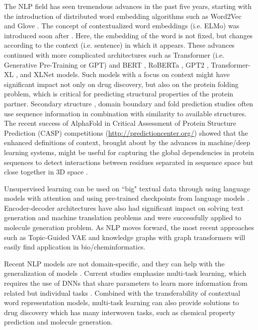 \documentclass[review]{elsarticle}
\begin{document}
The NLP field has seen tremendous advances in the past five years, starting with the introduction of distributed word embedding algorithms such as Word2Vec \cite{mikolov2013distributed} and Glove \cite{pennington2014glove}.  The concept of contextualized word embeddings (i.e. ELMo) was introduced soon after \cite{peters2018deep}. Here, the embedding of the word is not fixed, but changes according to the context (i.e. sentence) in which it appears. These advances continued with more complicated architectures such as  Transformer (i.e. Generative Pre-Training or GPT) \cite{radford2018improving}  and BERT \cite{devlin2018bert}, RoBERTa \cite{liu2019roberta}, GPT2 \cite{radford2019language}, Transformer-XL \cite{dai2019transformer}, and XLNet \cite{yang2019xlnet} models. Such models with a focus on context might have significant impact not only on drug discovery, but also on the protein folding problem, which is critical for predicting structural properties of the protein partner.  Secondary structure \cite{hanson2019getting, zhu2019predicting, wang2016protein}, domain boundary \cite{shi2019dnn} and fold \cite{wei2015enhanced} prediction studies often use sequence information in combination with similarity to available structures.  The recent success of AlphaFold \cite{evans2018novo} in Critical Assessment of Protein Structure Prediction (CASP) competitions (\url{http://predictioncenter.org/}) showed that the enhanced definitions of context, brought about by the advances in machine/deep learning systems, might be useful for capturing the global dependencies in protein sequences to detect interactions between residues separated in sequence space but close together in 3D space \cite{hanson2019getting}.


Unsupervised learning can be used on ``big" textual data through using language models with attention \cite{Vaswani:2017ul} and using pre-trained checkpoints from language models \cite{Rothe:2019wo}. Encoder-decoder architectures have also had significant impact on solving text generation and machine translation problems and were successfully applied to molecule generation problem. As NLP moves forward, the most recent approaches such as Topic-Guided VAE \cite{wang2019topic} and knowledge graphs with graph transformers \cite{koncel2019text} will easily find application in bio/cheminformatics.


Recent NLP models are not domain-specific, and they can help with the generalization of  models  \cite{radford2019language}. Current studies emphasize multi-task learning, which requires the use of DNNs that share parameters to learn more information from related but individual tasks \cite{ruder2019neural, radford2019language}. Combined with the transferability of contextual word representation models, multi-task learning can also provide solutions to drug discovery which has many interwoven tasks, such as chemical property prediction and molecule generation. 
\end{document}

